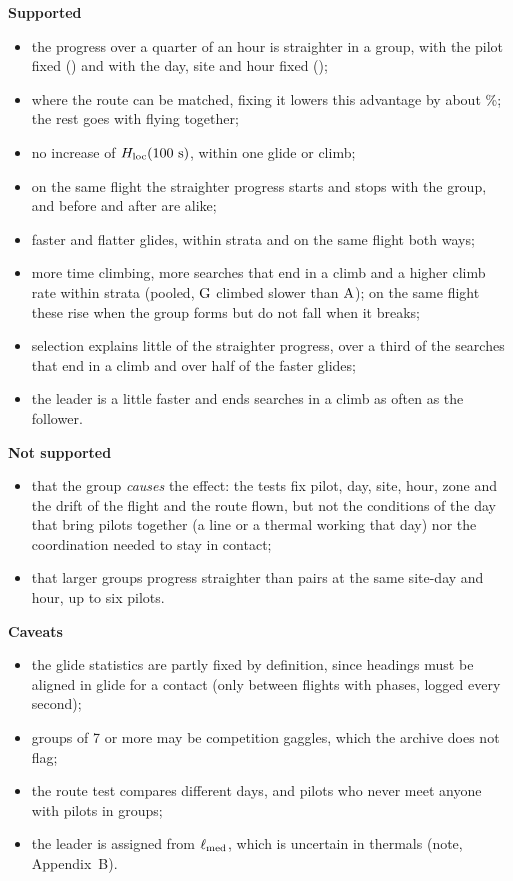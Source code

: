 \medskip
\noindent
\begin{minipage}[t]{0.49\textwidth}
\textbf{Supported}
\begin{itemize}
  \item the progress over a quarter of an hour is straighter in a group, with the pilot fixed
        (\DHlocThousandFlight) and with the day, site and hour fixed (\DHlocThousandGroupSdh);
  \item where the route can be matched, fixing it lowers this advantage by about \RouteExplained\%; the
        rest goes with flying together;
  \item no increase of $H_\mathrm{loc}(100~\mathrm{s})$, within one glide or climb;
  \item on the same flight the straighter progress starts and stops with the group, and before and
        after are alike;
  \item faster and flatter glides, within strata and on the same flight both ways;
  \item more time climbing, more searches that end in a climb and a higher climb rate within strata
        (pooled, $\mathrm{G}$ climbed slower than $\mathrm{A}$); on the same flight these rise when the group forms but
        do not fall when it breaks;
  \item selection explains little of the straighter progress, over a third of the searches that end in
        a climb and over half of the faster glides;
  \item the leader is a little faster and ends searches in a climb as often as the follower.
\end{itemize}
\end{minipage}\hfill
\begin{minipage}[t]{0.49\textwidth}
\textbf{Not supported}
\begin{itemize}
  \item that the group \emph{causes} the effect: the tests fix pilot, day, site, hour, zone and the
        drift of the flight and the route flown, but not the conditions of the day that bring pilots
        together (a line or a thermal working that day) nor the coordination needed to stay in contact;
  \item that larger groups progress straighter than pairs at the same site-day and hour, up to six
        pilots.
\end{itemize}
\medskip
\textbf{Caveats}
\begin{itemize}
  \item the glide statistics are partly fixed by definition, since headings must be aligned in glide
        for a contact (only between flights with phases, logged every second);
  \item groups of 7 or more may be competition gaggles, which the archive does not flag;
  \item the route test compares different days, and pilots who never meet anyone with pilots in
        groups;
  \item the leader is assigned from $\ell_{\rm med}$, which is uncertain in thermals (note,
        Appendix~B).
\end{itemize}
\end{minipage}

